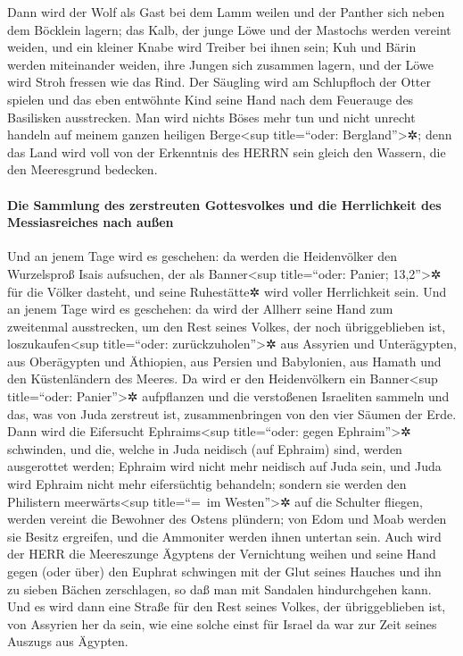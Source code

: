 Dann wird der Wolf als Gast bei dem Lamm weilen und der
Panther sich neben dem Böcklein lagern; das Kalb, der junge Löwe und der
Mastochs werden vereint weiden, und ein kleiner Knabe wird Treiber bei
ihnen sein; Kuh und Bärin werden miteinander weiden, ihre
Jungen sich zusammen lagern, und der Löwe wird Stroh fressen wie das
Rind. Der Säugling wird am Schlupfloch der Otter spielen
und das eben entwöhnte Kind seine Hand nach dem Feuerauge des Basilisken
ausstrecken. Man wird nichts Böses mehr tun und nicht
unrecht handeln auf meinem ganzen heiligen Berge\textless sup
title=``oder: Bergland''\textgreater✲; denn das Land wird voll von der
Erkenntnis des HERRN sein gleich den Wassern, die den Meeresgrund
bedecken.

\hypertarget{die-sammlung-des-zerstreuten-gottesvolkes-und-die-herrlichkeit-des-messiasreiches-nach-auuxdfen}{%
\paragraph{Die Sammlung des zerstreuten Gottesvolkes und die
Herrlichkeit des Messiasreiches nach
außen}\label{die-sammlung-des-zerstreuten-gottesvolkes-und-die-herrlichkeit-des-messiasreiches-nach-auuxdfen}}

Und an jenem Tage wird es geschehen: da werden die
Heidenvölker den Wurzelsproß Isais aufsuchen, der als
Banner\textless sup title=``oder: Panier; 13,2''\textgreater✲ für die
Völker dasteht, und seine Ruhestätte✲ wird voller Herrlichkeit sein.
Und an jenem Tage wird es geschehen: da wird der Allherr
seine Hand zum zweitenmal ausstrecken, um den Rest seines Volkes, der
noch übriggeblieben ist, loszukaufen\textless sup title=``oder:
zurückzuholen''\textgreater✲ aus Assyrien und Unterägypten, aus
Oberägypten und Äthiopien, aus Persien und Babylonien, aus Hamath und
den Küstenländern des Meeres. Da wird er den
Heidenvölkern ein Banner\textless sup title=``oder:
Panier''\textgreater✲ aufpflanzen und die verstoßenen Israeliten sammeln
und das, was von Juda zerstreut ist, zusammenbringen von den vier Säumen
der Erde. Dann wird die Eifersucht Ephraims\textless sup
title=``oder: gegen Ephraim''\textgreater✲ schwinden, und die, welche in
Juda neidisch (auf Ephraim) sind, werden ausgerottet werden; Ephraim
wird nicht mehr neidisch auf Juda sein, und Juda wird Ephraim nicht mehr
eifersüchtig behandeln; sondern sie werden den Philistern
meerwärts\textless sup title=``=~im Westen''\textgreater✲ auf die
Schulter fliegen, werden vereint die Bewohner des Ostens plündern; von
Edom und Moab werden sie Besitz ergreifen, und die Ammoniter werden
ihnen untertan sein. Auch wird der HERR die Meereszunge
Ägyptens der Vernichtung weihen und seine Hand gegen (oder über) den
Euphrat schwingen mit der Glut seines Hauches und ihn zu sieben Bächen
zerschlagen, so daß man mit Sandalen hindurchgehen kann.
Und es wird dann eine Straße für den Rest seines Volkes,
der übriggeblieben ist, von Assyrien her da sein, wie eine solche einst
für Israel da war zur Zeit seines Auszugs aus Ägypten.

